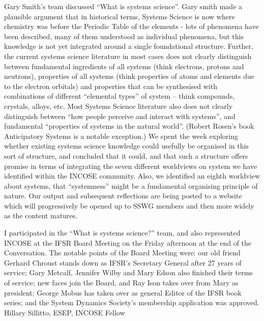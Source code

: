 Gary Smith’s team discussed ``What is systems science''. Gary smith made a plausible argument that in historical terms, Systems Science is now where chemistry was before the Periodic Table of the elements - lots of phenomena have been described, many of them understood as individual phenomena, but this knowledge is not yet integrated around a single foundational structure. Further, the current systems science literature in most cases does not clearly distinguish between fundamental ingredients of all systems (think electrons, protons and neutrons), properties of all systems (think properties of atoms and elements due to the electron orbitals) and properties that can be synthesised with combinations of different ``elemental types'' of system – think compounds, crystals, alloys, etc. Most Systems Science literature also does not clearly distinguish between ``how people perceive and interact with systems'', and fundamental ``properties of systems in the natural world''. (Robert Rosen’s book Anticipatory Systems is a notable exception.) We spent the week exploring whether existing systems science knowledge could usefully be organised in this sort of structure, and concluded that it could, and that such a structure offers promise in terms of integrating the seven different worldviews on system we have identified within the INCOSE community. Also, we identified an eighth worldview about systems, that ``systemness'' might be a fundamental organising principle of nature. Our output and subsequent reflections are being posted to a website which will progressively be opened up to SSWG members and then more widely as the content matures.

I participated in the “What is systems science?” team, and also represented INCOSE at the IFSR Board Meeting on the Friday afternoon at the end of the Conversation. The notable points of the Board Meeting were: our old friend Gerhard Chroust stands down as IFSR’s Secretary General after 27 years of service; Gary Metcalf, Jennifer Wilby and Mary Edson also finished their terms of service; new faces join the Board, and Ray Ison takes over from Mary as president; George Mobus has taken over as general Editor of the IFSR book series; and the System Dynamics Society’s membership application was approved. Hillary Sillitto, ESEP, INCOSE Fellow
